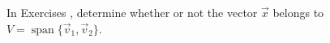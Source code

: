 {In Exercises}
{, determine whether or not the vector $\vec{x}$ belongs to $V = \operatorname{span}\{\vec{v}_1,\vec{v}_2\}$.}
